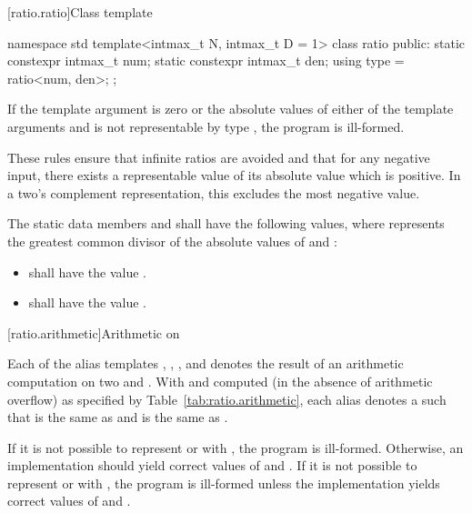 [ratio.ratio]{Class template }

%
\begin{codeblock}
namespace std {
  template<intmax_t N, intmax_t D = 1> class ratio {
  public:
    static constexpr intmax_t num;
    static constexpr intmax_t den;
    using type = ratio<num, den>;
  };
}
\end{codeblock}

\pnum
{}%
If the template argument  is zero or the absolute values of either of the
template arguments  and  is not representable by type
, the program is ill-formed. \begin{note} These rules ensure that infinite
ratios are avoided and that for any negative input, there exists a representable value
of its absolute value which is positive. In a two's complement representation, this
excludes the most negative value. \end{note}

\pnum
The static data members  and  shall have the following values,
where  represents the greatest common divisor of the absolute values of
 and :

\begin{itemize}
\item {} shall have the value .
\item {} shall have the value .
\end{itemize}

[ratio.arithmetic]{Arithmetic on }

\pnum
Each of the alias templates , , ,
and  denotes the result of an arithmetic computation on two
  and . With  and  computed (in the
absence of arithmetic overflow) as specified by Table~\ref{tab:ratio.arithmetic}, each alias
denotes a  such that  is the same as  and
 is the same as .

\pnum
If it is not possible to represent  or  with , the program is
ill-formed. Otherwise, an implementation should yield correct values of  and
. If it is not possible to represent  or  with , the
program is ill-formed unless the implementation yields correct values of  and
.

